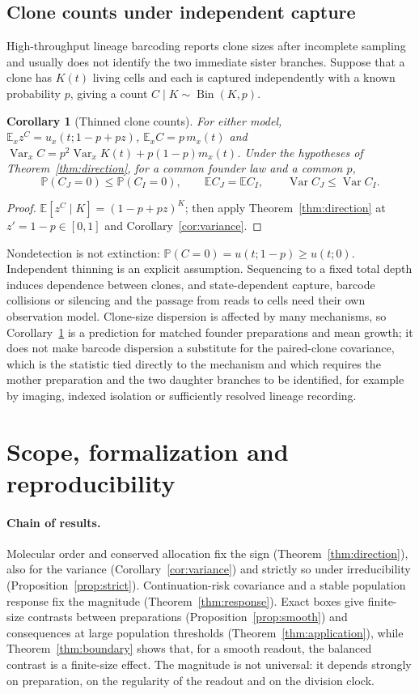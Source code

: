 \documentclass[11pt]{article}
\newtheorem{corollary}[theorem]{Corollary}
\theoremstyle{remark}
\newcommand{\E}{\mathbb E}
\newcommand{\PP}{\mathbb P}
\newcommand{\Var}{\operatorname{Var}}
\newcommand{\Bin}{\operatorname{Bin}}
\begin{document}
\subsection{Clone counts under independent capture}
High-throughput lineage barcoding
\cite{gutierrez2021,kong2020,biddy2018,oren2021} reports clone sizes after
incomplete sampling and usually does not identify the two immediate sister
branches. Suppose that a clone has $K(t)$ living cells and each is captured
independently with a known probability $p$, giving a count
$C\mid K\sim\Bin(K,p)$.

\begin{corollary}[Thinned clone counts]\label{cor:capture}
For either model,
$\E_xz^C=u_x(t;1-p+pz)$, $\E_xC=p\,m_x(t)$ and
$\Var_xC=p^2\Var_xK(t)+p(1-p)m_x(t)$. Under the hypotheses of
Theorem~\ref{thm:direction}, for a common founder law and a common $p$,
\[
 \PP(C_J=0)\le\PP(C_I=0),\qquad\E C_J=\E C_I,\qquad\Var C_J\le\Var C_I .
\]
\end{corollary}
\begin{proof}
$\E[z^C\mid K]=(1-p+pz)^K$; then apply Theorem~\ref{thm:direction} at
$z'=1-p\in[0,1]$ and Corollary~\ref{cor:variance}.
\end{proof}
Nondetection is not extinction: $\PP(C=0)=u(t;1-p)\ge u(t;0)$. Independent
thinning is an explicit assumption. Sequencing to a fixed total depth induces
dependence between clones, and state-dependent capture, barcode collisions or
silencing and the passage from reads to cells need their own observation
model. Clone-size dispersion is affected by many mechanisms, so
Corollary~\ref{cor:capture} is a prediction for matched founder preparations
and mean growth; it does not make barcode dispersion a substitute for the
paired-clone covariance, which is the statistic tied directly to the
mechanism and which requires the mother preparation and the two daughter
branches to be identified, for example by imaging, indexed isolation or
sufficiently resolved lineage recording.

\section{Scope, formalization and reproducibility}\label{sec:scope}

\paragraph{Chain of results.} Molecular order and conserved allocation fix
the sign (Theorem~\ref{thm:direction}), also for the variance
(Corollary~\ref{cor:variance}) and strictly so under irreducibility
(Proposition~\ref{prop:strict}). Continuation-risk covariance and a stable
population response fix the magnitude (Theorem~\ref{thm:response}). Exact
boxes give finite-size contrasts between preparations
(Proposition~\ref{prop:smooth}) and consequences at large population
thresholds (Theorem~\ref{thm:application}), while
Theorem~\ref{thm:boundary} shows that, for a smooth readout, the balanced
contrast is a finite-size effect. The magnitude is not universal: it depends
strongly on preparation, on the regularity of the readout and on the division
clock.
\end{document}
